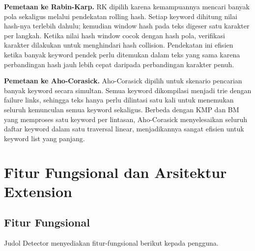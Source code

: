 \textbf{Pemetaan ke Rabin-Karp.}
RK dipilih karena kemampuannya mencari banyak pola sekaligus melalui
pendekatan rolling hash. Setiap keyword dihitung nilai hash-nya terlebih
dahulu; kemudian window hash pada teks digeser satu karakter per langkah.
Ketika nilai hash window cocok dengan hash pola, verifikasi karakter
dilakukan untuk menghindari hash collision. Pendekatan ini efisien ketika
banyak keyword pendek perlu ditemukan dalam teks yang sama karena
perbandingan hash jauh lebih cepat daripada perbandingan karakter penuh.

\textbf{Pemetaan ke Aho-Corasick.}
Aho-Corasick dipilih untuk skenario pencarian banyak keyword secara
simultan. Semua keyword dikompilasi menjadi trie dengan failure links,
sehingga teks hanya perlu dilintasi satu kali untuk menemukan seluruh
kemunculan semua keyword sekaligus. Berbeda dengan KMP dan BM yang
memproses satu keyword per lintasan, Aho-Corasick menyelesaikan seluruh
daftar keyword dalam satu traversal linear, menjadikannya sangat efisien
untuk keyword list yang panjang.

\section{Fitur Fungsional dan Arsitektur Extension}

\subsection{Fitur Fungsional}

Judol Detector menyediakan fitur-fungsional berikut kepada pengguna.

